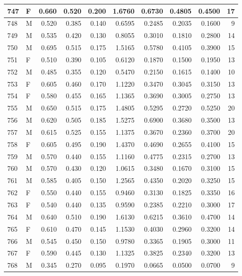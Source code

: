 \documentclass[9pt,twocolumn,twoside,]{pnas-new}
\begin{document}
\begin{tabular}{l|l|r|r|r|r|r|r|r|r}
\hline
747 & F & 0.660 & 0.520 & 0.200 & 1.6760 & 0.6730 & 0.4805 & 0.4500 & 17\\
\hline
748 & M & 0.520 & 0.385 & 0.140 & 0.6595 & 0.2485 & 0.2035 & 0.1600 & 9\\
\hline
749 & M & 0.535 & 0.420 & 0.130 & 0.8055 & 0.3010 & 0.1810 & 0.2800 & 14\\
\hline
750 & M & 0.695 & 0.515 & 0.175 & 1.5165 & 0.5780 & 0.4105 & 0.3900 & 15\\
\hline
751 & F & 0.510 & 0.390 & 0.105 & 0.6120 & 0.1870 & 0.1500 & 0.1950 & 13\\
\hline
752 & M & 0.485 & 0.355 & 0.120 & 0.5470 & 0.2150 & 0.1615 & 0.1400 & 10\\
\hline
753 & F & 0.605 & 0.460 & 0.170 & 1.1220 & 0.3470 & 0.3045 & 0.3150 & 13\\
\hline
754 & F & 0.580 & 0.455 & 0.165 & 1.1365 & 0.3690 & 0.3005 & 0.2750 & 13\\
\hline
755 & M & 0.650 & 0.515 & 0.175 & 1.4805 & 0.5295 & 0.2720 & 0.5250 & 20\\
\hline
756 & M & 0.620 & 0.505 & 0.185 & 1.5275 & 0.6900 & 0.3680 & 0.3500 & 13\\
\hline
757 & M & 0.615 & 0.525 & 0.155 & 1.1375 & 0.3670 & 0.2360 & 0.3700 & 20\\
\hline
758 & F & 0.605 & 0.495 & 0.190 & 1.4370 & 0.4690 & 0.2655 & 0.4100 & 15\\
\hline
759 & M & 0.570 & 0.440 & 0.155 & 1.1160 & 0.4775 & 0.2315 & 0.2700 & 13\\
\hline
760 & M & 0.570 & 0.430 & 0.120 & 1.0615 & 0.3480 & 0.1670 & 0.3100 & 15\\
\hline
761 & M & 0.585 & 0.405 & 0.150 & 1.2565 & 0.4350 & 0.2020 & 0.3250 & 15\\
\hline
762 & F & 0.550 & 0.440 & 0.155 & 0.9460 & 0.3130 & 0.1825 & 0.3350 & 16\\
\hline
763 & F & 0.540 & 0.440 & 0.135 & 0.9590 & 0.2385 & 0.2210 & 0.3000 & 17\\
\hline
764 & M & 0.640 & 0.510 & 0.190 & 1.6130 & 0.6215 & 0.3610 & 0.4700 & 14\\
\hline
765 & F & 0.610 & 0.470 & 0.145 & 1.1530 & 0.4030 & 0.2960 & 0.3200 & 14\\
\hline
766 & M & 0.545 & 0.450 & 0.150 & 0.9780 & 0.3365 & 0.1905 & 0.3000 & 11\\
\hline
767 & F & 0.590 & 0.445 & 0.130 & 1.1325 & 0.3825 & 0.2340 & 0.3200 & 13\\
\hline
768 & M & 0.345 & 0.270 & 0.095 & 0.1970 & 0.0665 & 0.0500 & 0.0700 & 9\\

\end{tabular}
\end{document}
